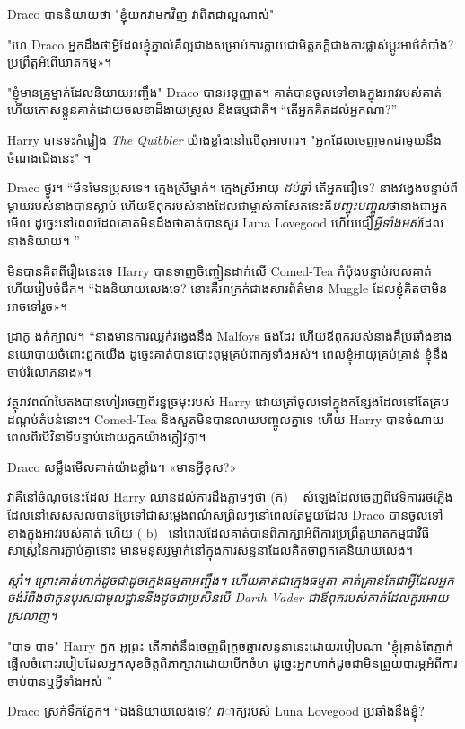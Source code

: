 Draco បាននិយាយថា "ខ្ញុំយកវាមកវិញ វាពិតជាល្អណាស់"

"ហេ Draco អ្នកដឹងថាអ្វីដែលខ្ញុំភ្នាល់គឺល្អជាងសម្រាប់ការក្លាយជាមិត្តភក្តិជាងការផ្លាស់ប្តូរអាថ៌កំបាំង? ប្រព្រឹត្ត​អំពើ​ឃាតកម្ម»។

"ខ្ញុំមានគ្រូម្នាក់ដែលនិយាយអញ្ចឹង" Draco បានអនុញ្ញាត។ គាត់បានចូលទៅខាងក្នុងអាវរបស់គាត់ ហើយកោសខ្លួនគាត់ដោយចលនាដ៏ងាយស្រួល និងធម្មជាតិ។ “តើអ្នកគិតដល់អ្នកណា?”

Harry បានទះកំផ្លៀង \emph{The Quibbler} យ៉ាងខ្លាំងនៅលើតុអាហារ។ "អ្នក​ដែល​ចេញ​មក​ជាមួយ​នឹង​ចំណងជើង​នេះ​" ។

Draco ថ្ងូរ។ “មិនមែនប្រុសទេ។ ក្មេងស្រីម្នាក់។ ក្មេងស្រីអាយុ \emph{ដប់ឆ្នាំ} តើអ្នកជឿទេ? នាងវង្វេងបន្ទាប់ពីម្តាយរបស់នាងបានស្លាប់ ហើយឪពុករបស់នាងដែលជាម្ចាស់កាសែតនេះគឺ\emph{បញ្ចុះបញ្ចូល}ថានាងជាអ្នកមើល ដូច្នេះនៅពេលដែលគាត់មិនដឹងថាគាត់បានសួរ Luna Lovegood ហើយជឿ\emph{អ្វីទាំងអស់}ដែលនាងនិយាយ។ ”

មិន​បាន​គិត​ពី​រឿង​នេះ​ទេ Harry បាន​ទាញ​ចិញ្ចៀន​ដាក់​លើ Comed-Tea កំប៉ុង​បន្ទាប់​របស់​គាត់ ហើយ​រៀបចំ​ផឹក។ “ឯងនិយាយលេងទេ? នោះ​គឺ​អាក្រក់​ជាង​សារព័ត៌មាន Muggle ដែល​ខ្ញុំ​គិត​ថា​មិន​អាច​ទៅ​រួច»។

ដ្រាកូ ងក់ក្បាល។ “នាងមានការឈ្លក់វង្វេងនឹង Malfoys ផងដែរ ហើយឪពុករបស់នាងគឺប្រឆាំងខាងនយោបាយចំពោះពួកយើង ដូច្នេះគាត់បានបោះពុម្ពគ្រប់ពាក្យទាំងអស់។ ពេល​ខ្ញុំ​អាយុ​គ្រប់​គ្រាន់ ខ្ញុំ​នឹង​ចាប់​រំលោភ​នាង»។

វត្ថុរាវពណ៌បៃតងបានហៀរចេញពីរន្ធច្រមុះរបស់ Harry ដោយត្រាំចូលទៅក្នុងកន្សែងដែលនៅតែគ្របដណ្ដប់តំបន់នោះ។ Comed-Tea និងសួតមិនបានលាយបញ្ចូលគ្នាទេ ហើយ Harry បានចំណាយពេលពីរបីវិនាទីបន្ទាប់ដោយក្អកយ៉ាងក្លៀវក្លា។

Draco សម្លឹងមើលគាត់យ៉ាងខ្លាំង។ «មាន​អ្វី​ខុស?»

វាគឺនៅចំណុចនេះដែល Harry ឈានដល់ការដឹងភ្លាមៗថា (ក) ~ សំឡេងដែលចេញពីវេទិការរថភ្លើងដែលនៅសេសសល់បានប្រែទៅជាសម្លេងពណ៌សព្រិលៗនៅពេលតែមួយដែល Draco បានចូលទៅខាងក្នុងអាវរបស់គាត់ ហើយ ( b)~ នៅពេលដែលគាត់បានពិភាក្សាអំពីការប្រព្រឹត្តឃាតកម្មជាវិធីសាស្រ្តនៃការភ្ជាប់គ្នានោះ មានមនុស្សម្នាក់នៅក្នុងការសន្ទនាដែលគិតថាពួកគេនិយាយលេង។

\emph{ស្ដាំ។ ព្រោះគាត់\emph{ហាក់ដូចជា}ដូចក្មេងធម្មតាអញ្ចឹង។ ហើយគាត់\emph{ជា}ក្មេងធម្មតា គាត់គ្រាន់តែជាអ្វីដែលអ្នកចង់\emph{រំពឹងថា}កូនបុរសជាមូលដ្ឋាននឹងដូចជាប្រសិនបើ Darth Vader ជាឪពុករបស់គាត់ដែលគួរអោយស្រលាញ់។}

"បាទ បាទ" Harry ក្អក អូព្រះ តើគាត់នឹងចេញពីក្រូចឆ្មារសន្ទនានេះដោយរបៀបណា "ខ្ញុំគ្រាន់តែភ្ញាក់ផ្អើលចំពោះរបៀបដែលអ្នកសុខចិត្តពិភាក្សាវាដោយបើកចំហ ដូច្នេះអ្នកហាក់ដូចជាមិនព្រួយបារម្ភអំពីការចាប់បានឬអ្វីទាំងអស់ ”

Draco ស្រក់ទឹកភ្នែក។ “ឯងនិយាយលេងទេ? \emph ពាក្យរបស់ Luna Lovegood ប្រឆាំងនឹងខ្ញុំ?

